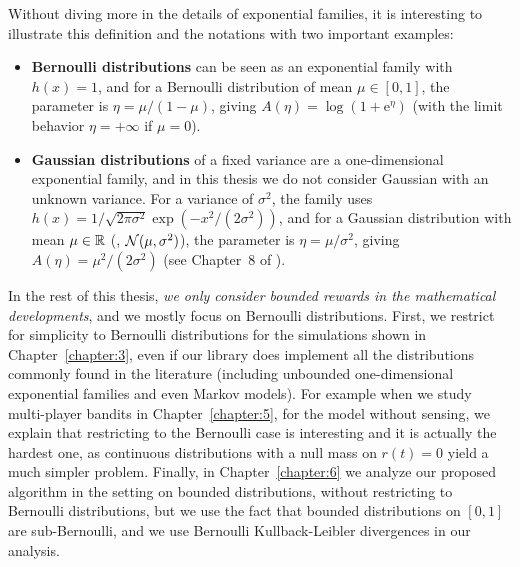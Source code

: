 Without diving more in the details of exponential families,
it is interesting to illustrate this definition and the notations with two important examples:
%
\begin{itemize}
    \item
    \textbf{Bernoulli distributions} can be seen as an exponential family with $h(x) = 1$,
    and for a Bernoulli distribution of mean $\mu\in[0,1]$,
    the parameter is $\eta = \mu / (1 - \mu)$, giving $A(\eta) = \log(1 + \mathrm{e}^{\eta})$
    (with the limit behavior $\eta=+\infty$ if $\mu=0$).

    \item
    \textbf{Gaussian distributions} of a fixed variance are a one-dimensional exponential family,
    and in this thesis we do not consider Gaussian with an unknown variance.
    For a variance of $\sigma^2$, the family uses
    $h(x) = 1/\sqrt{2\pi\sigma^2} \exp(-x^2/(2\sigma^2))$,
    and for a Gaussian distribution with mean $\mu\in\mathbb{R}$ (\ie, $\mathcal{N}(\mu,\sigma^2)$),
    the parameter is $\eta = \mu/\sigma^2$, giving $A(\eta) = \mu^2/(2\sigma^2)$
    (see Chapter~8 of \cite{JordanCourseStatBerkeley}).
\end{itemize}


In the rest of this thesis, \emph{we only consider bounded rewards in the mathematical developments}, and we mostly focus on Bernoulli distributions.
First, we restrict for simplicity to Bernoulli distributions for the simulations shown in Chapter~\ref{chapter:3}, even if our library does implement all the distributions commonly found in the literature (including unbounded one-dimensional exponential families and even Markov models).
%
For example when we study multi-player bandits in Chapter~\ref{chapter:5}, for the model without sensing, we explain that restricting to the Bernoulli case is interesting and it is actually the hardest one, as continuous distributions with a null mass on $r(t)=0$ yield a much simpler problem.
%
Finally, in Chapter~\ref{chapter:6} we analyze our proposed algorithm in the setting on bounded distributions, without restricting to Bernoulli distributions, but we use the fact that bounded distributions on $[0,1]$ are sub-Bernoulli, and we use Bernoulli Kullback-Leibler divergences in our analysis.


